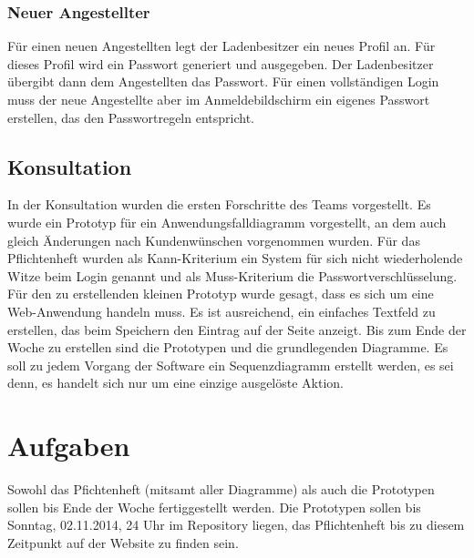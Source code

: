 \documentclass{scrartcl}
\begin{document}
\subsubsection{Neuer Angestellter}
Für einen neuen Angestellten legt der Ladenbesitzer ein neues Profil an. Für dieses Profil wird ein Passwort generiert und ausgegeben. Der Ladenbesitzer übergibt dann dem Angestellten das Passwort. Für einen vollständigen Login muss der neue Angestellte aber im Anmeldebildschirm ein eigenes Passwort erstellen, das den Passwortregeln entspricht.
\subsection{Konsultation}
In der Konsultation wurden die ersten Forschritte des Teams vorgestellt. Es wurde ein Prototyp für ein Anwendungsfalldiagramm
vorgestellt, an dem auch gleich Änderungen nach Kundenwünschen vorgenommen wurden. 
Für das Pflichtenheft wurden 
als Kann-Kriterium ein System für sich nicht wiederholende Witze beim Login genannt und als Muss-Kriterium die
Passwortverschlüsselung. 
Für den zu erstellenden kleinen Prototyp wurde gesagt, dass es sich um eine Web-Anwendung
handeln muss. Es ist ausreichend, ein einfaches Textfeld zu erstellen, das beim Speichern den Eintrag auf der
Seite anzeigt.
Bis zum Ende der Woche zu erstellen sind die Prototypen und die grundlegenden Diagramme. Es soll zu jedem Vorgang
der Software ein Sequenzdiagramm erstellt werden, es sei denn, es handelt sich nur um eine einzige ausgelöste Aktion.

\vspace*{1em}
\section{Aufgaben}
Sowohl das Pfichtenheft (mitsamt aller Diagramme) als auch die Prototypen sollen bis Ende der Woche fertiggestellt werden. Die Prototypen sollen bis Sonntag, 02.11.2014, 24 Uhr im Repository liegen, das Pflichtenheft bis zu diesem Zeitpunkt auf der Website zu finden sein.
\end{document}
